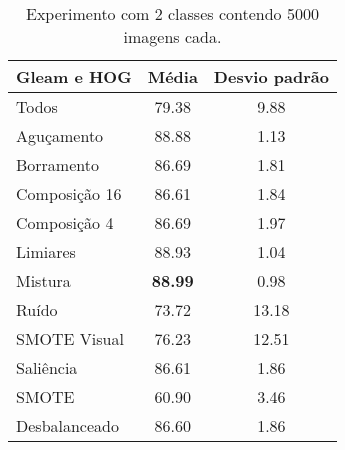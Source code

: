 \begin{itemize}
\begin{table}[!htbp]
\centering
\caption{Experimento com 2 classes contendo 5000 imagens cada.}
\label{my-label}
\begin{tabular}{|l|c|c|}
\hline
\textbf{Gleam e HOG} & \textbf{Média} & \textbf{Desvio padrão} \\ \hline
Todos                & 79.38          & 9.88                   \\ \hline
Aguçamento           & 88.88          & 1.13                   \\ \hline
Borramento           & 86.69          & 1.81                   \\ \hline
Composição 16        & 86.61          & 1.84                   \\ \hline
Composição 4         & 86.69          & 1.97                   \\ \hline
Limiares             & 88.93          & 1.04                   \\ \hline
Mistura              & \textbf{88.99} & 0.98                   \\ \hline
Ruído                & 73.72          & 13.18                  \\ \hline
SMOTE Visual         & 76.23          & 12.51                  \\ \hline
Saliência            & 86.61          & 1.86                   \\ \hline
SMOTE                & 60.90          & 3.46                   \\ \hline
Desbalanceado        & 86.60          & 1.86                   \\ \hline
\end{tabular}
\end{table}

\end{itemize}


